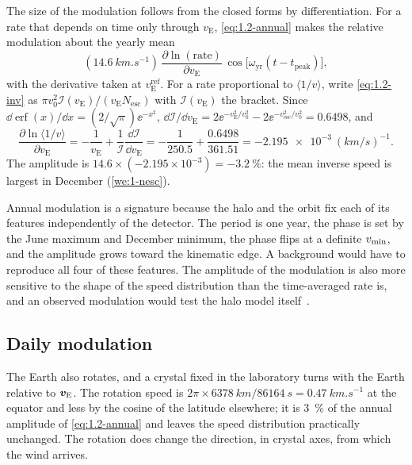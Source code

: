 The size of the modulation follows from the closed forms by differentiation. For a rate that depends on time only through $v_{\mathrm{E}}$, \cref{eq:1.2-annual} makes the relative modulation about the yearly mean
\begin{equation*}
  (\SI{14.6}{km.s^{-1}})\,\frac{\partial \ln(\text{rate})}{\partial v_{\mathrm{E}}}\, \cos\bigl[\omega_{\mathrm{yr}}(t - t_{\mathrm{peak}})\bigr],
\end{equation*}
with the derivative taken at $v_{\mathrm{E}}^{\mathrm{ref}}$. For a rate proportional to $\langle 1/v\rangle$, write \cref{eq:1.2-inv} as $\pi v_0^2 \mathcal{I}(v_{\mathrm{E}})/(v_{\mathrm{E}} N_{\mathrm{esc}})$ with $\mathcal{I}(v_{\mathrm{E}})$ the bracket. Since $\dd \operatorname{erf}(x)/\dd x = (2/\sqrt{\pi})\ee^{-x^2}$, $\dd \mathcal{I}/\dd v_{\mathrm{E}} = 2\ee^{-v_{\mathrm{E}}^2/v_0^2} - 2\ee^{-v_{\mathrm{esc}}^2/v_0^2} = 0.6498$, and
\begin{equation*}
  \frac{\partial \ln\langle 1/v\rangle}{\partial v_{\mathrm{E}}} = -\frac{1}{v_{\mathrm{E}}} + \frac{1}{\mathcal{I}}\frac{\dd \mathcal{I}}{\dd v_{\mathrm{E}}} = -\frac{1}{250.5} + \frac{0.6498}{361.51} = \SI{-2.195e-3}{(km/s)^{-1}}.
\end{equation*}
The amplitude is $14.6 \times (-2.195\times10^{-3}) = \SI{-3.2}{\percent}$: the mean inverse speed is largest in December (\cref{we:1-nesc}).

Annual modulation is a signature because the halo and the orbit fix each of its features independently of the detector. The period is one year, the phase is set by the June maximum and December minimum, the phase flips at a definite $v_{\mathrm{min}}$, and the amplitude grows toward the kinematic edge. A background would have to reproduce all four of these features. The amplitude of the modulation is also more sensitive to the shape of the speed distribution than the time-averaged rate is, and an observed modulation would test the halo model itself~\cite[Sect.~6.2]{green2012astrophysical}.

\subsection{Daily modulation}

The Earth also rotates, and a crystal fixed in the laboratory turns with the Earth relative to $\bm{v}_{\mathrm{E}}$. The rotation speed is $2\pi \times \SI{6378}{km}/\SI{86164}{s} = \SI{0.47}{km.s^{-1}}$ at the equator and less by the cosine of the latitude elsewhere; it is \SI{3}{\percent} of the annual amplitude of \cref{eq:1.2-annual} and leaves the speed distribution practically unchanged. The rotation does change the direction, in crystal axes, from which the wind arrives.

